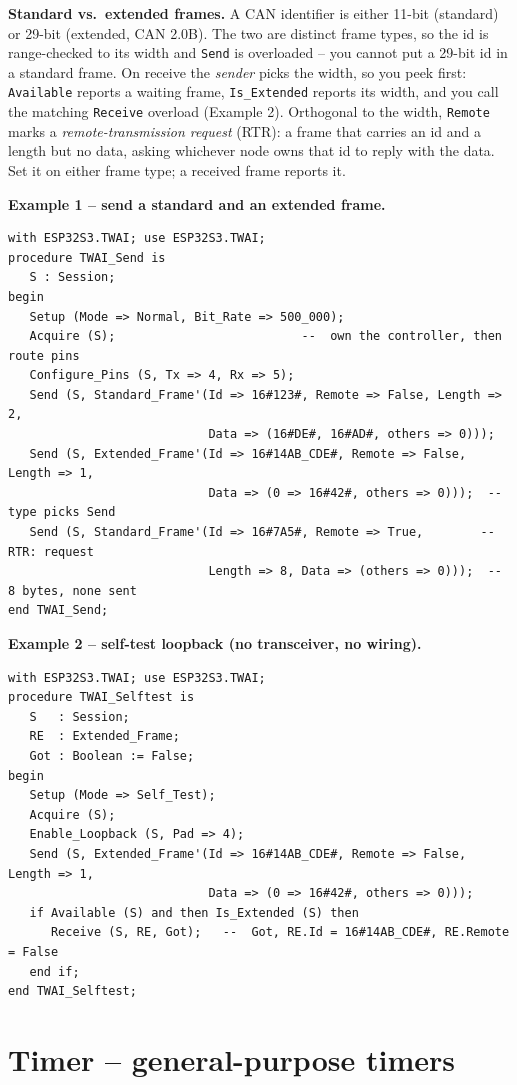 \textbf{Standard vs.\ extended frames.} A CAN identifier is either 11-bit
(standard) or 29-bit (extended, CAN 2.0B). The two are distinct frame types, so
the id is range-checked to its width and \texttt{Send} is overloaded -- you
cannot put a 29-bit id in a standard frame. On receive the \emph{sender} picks
the width, so you peek first: \texttt{Available} reports a waiting frame,
\texttt{Is\_Extended} reports its width, and you call the matching
\texttt{Receive} overload (Example 2). Orthogonal to the width, \texttt{Remote}
marks a \emph{remote-transmission request} (RTR): a frame that carries an id and a
length but no data, asking whichever node owns that id to reply with the data.
Set it on either frame type; a received frame reports it.

\textbf{Example 1 -- send a standard and an extended frame.}
\begin{lstlisting}
with ESP32S3.TWAI; use ESP32S3.TWAI;
procedure TWAI_Send is
   S : Session;
begin
   Setup (Mode => Normal, Bit_Rate => 500_000);
   Acquire (S);                          --  own the controller, then route pins
   Configure_Pins (S, Tx => 4, Rx => 5);
   Send (S, Standard_Frame'(Id => 16#123#, Remote => False, Length => 2,
                            Data => (16#DE#, 16#AD#, others => 0)));
   Send (S, Extended_Frame'(Id => 16#14AB_CDE#, Remote => False, Length => 1,
                            Data => (0 => 16#42#, others => 0)));  -- type picks Send
   Send (S, Standard_Frame'(Id => 16#7A5#, Remote => True,        -- RTR: request
                            Length => 8, Data => (others => 0)));  -- 8 bytes, none sent
end TWAI_Send;
\end{lstlisting}

\textbf{Example 2 -- self-test loopback (no transceiver, no wiring).}
\begin{lstlisting}
with ESP32S3.TWAI; use ESP32S3.TWAI;
procedure TWAI_Selftest is
   S   : Session;
   RE  : Extended_Frame;
   Got : Boolean := False;
begin
   Setup (Mode => Self_Test);
   Acquire (S);
   Enable_Loopback (S, Pad => 4);
   Send (S, Extended_Frame'(Id => 16#14AB_CDE#, Remote => False, Length => 1,
                            Data => (0 => 16#42#, others => 0)));
   if Available (S) and then Is_Extended (S) then
      Receive (S, RE, Got);   --  Got, RE.Id = 16#14AB_CDE#, RE.Remote = False
   end if;
end TWAI_Selftest;
\end{lstlisting}

\section{Timer -- general-purpose timers}

